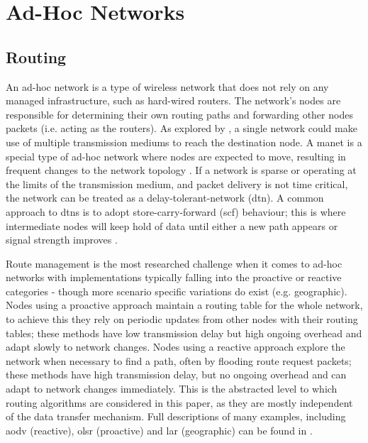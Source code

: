 \section{Ad-Hoc Networks}\label{sec:adhocnetworks}
\subsection{Routing}
An ad-hoc network is a type of wireless network that does not rely on any managed infrastructure, such as hard-wired routers. The network's nodes are responsible for determining their own routing paths and forwarding other nodes packets (i.e. acting as the routers). As explored by \cite{3YP:LORAWAN_MESH}, a single network could make use of multiple transmission mediums to reach the destination node. A \ac{manet} is a special type of ad-hoc network where nodes are expected to move, resulting in frequent changes to the network topology \cite{3YP:MANET_RFC2501}. If a network is sparse or operating at the limits of the transmission medium, and packet delivery is not time critical, the network can be treated as a delay-tolerant-network (\ac{dtn}). A common approach to \ac{dtn}s is to adopt store-carry-forward (\ac{scf}) behaviour; this is where intermediate nodes will keep hold of data until either a new path appears or signal strength improves \cite{3YP:DTNS}.
 
 Route management is the most researched challenge when it comes to ad-hoc networks \cite{3YP:MANET_RESEARCH_TRENDS} with implementations typically falling into the proactive or reactive categories - though more scenario specific variations do exist (e.g. geographic). Nodes using a proactive approach maintain a routing table for the whole network, to achieve this they rely on periodic updates from other nodes with their routing tables; these methods have low transmission delay but high ongoing overhead and adapt slowly to network changes. Nodes using a reactive approach explore the network when necessary to find a path, often by flooding route request packets; these methods have high transmission delay, but no ongoing overhead and can adapt to network changes immediately. This is the abstracted level to which routing algorithms are considered in this paper, as they are mostly independent of the data transfer mechanism. Full descriptions of many examples, including \ac{aodv} (reactive), \ac{olsr} (proactive) and \ac{lar} (geographic) can be found in \cite{3YP:ROUTING_ALGORITHMS}.
 

